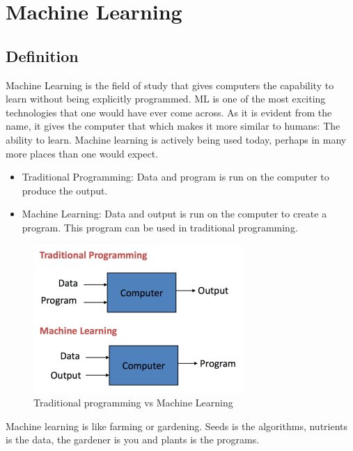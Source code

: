 
\chapter{Machine Learning} %

\label{Chapter7} %



\section{Definition}

Machine Learning is the field of study that gives computers the capability to learn without being explicitly programmed. ML is one of the most exciting technologies that one would have ever come across. As it is evident from the name, it gives the computer that which makes it more similar to humans: The ability to learn. Machine learning is actively being used today, perhaps in many more places than one would expect.

\begin{itemize}
\item Traditional Programming: Data and program is run on the computer to produce the output.
\item Machine Learning: Data and output is run on the computer to create a program. This program can be used in traditional programming.
\end{itemize}
\begin{figure}[htbp]
    \centering
	    \includegraphics[scale=0.5]{Figures/tl_ml.png}
        \caption[Traditional programming vs Machine Learning]{Traditional programming vs Machine Learning}
	    \label{fig:Traditional programming vs Machine Learning}
\end{figure}
 Machine learning is like farming or gardening. Seeds is the algorithms, nutrients is the data, the gardener is you and plants is the programs.
\clearpage
